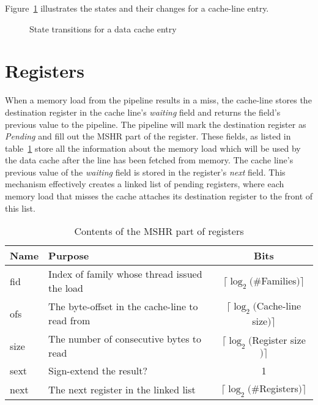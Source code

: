 Figure~\ref{fig:dcache-states} illustrates the states and their changes for a cache-line entry.

\begin{figure}
 \begin{center}
  
  \caption{State transitions for a data cache entry}
  \label{fig:dcache-states}
 \end{center}
\end{figure}

\section{Registers}
When a memory load from the pipeline results in a miss, the cache-line stores the destination register in the cache line's \emph{waiting} field and returns the field's previous value to the pipeline. The pipeline will mark the destination register as \emph{Pending} and fill out the {MSHR} part of the register. These fields, as listed in table~\ref{table:mshr_contents} store all the information about the memory load which will be used by the data cache after the line has been fetched from memory. The cache line's previous value of the \emph{waiting} field is stored in the register's \emph{next} field. This mechanism effectively creates a linked list of pending registers, where each memory load that misses the cache attaches its destination register to the front of this list.

\begin{table}
\begin{center}
\begin{tabular}{|l|l|c|}
\hline
Name & Purpose & Bits \\
\hline
\hline
fid & Index of family whose thread issued the load & $\lceil \log_2($\#Families$) \rceil$ \\
ofs & The byte-offset in the cache-line to read from & $\lceil \log_2($Cache-line size$) \rceil$ \\
size & The number of consecutive bytes to read & $\lceil \log_2($Register size$) \rceil$ \\
sext & Sign-extend the result? & 1 \\
next & The next register in the linked list & $\lceil \log_2($\#Registers$) \rceil$ \\
\hline
\end{tabular}
\caption{Contents of the MSHR part of registers}
\label{table:mshr_contents}
\end{center}
\end{table}

